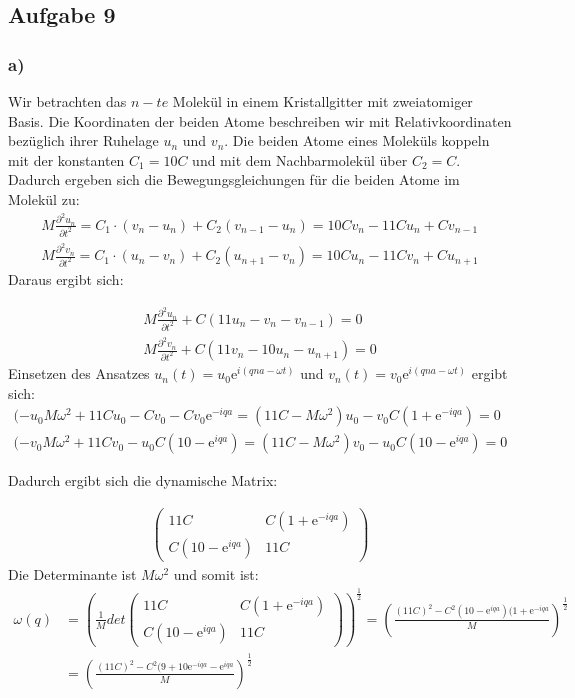 \documentclass[11pt]{article}
\begin{document}
\subsection*{Aufgabe 9}
\subsubsection*{a)}
Wir betrachten das $n-te$ Molekül in einem Kristallgitter mit zweiatomiger Basis. Die Koordinaten der beiden Atome beschreiben wir mit Relativkoordinaten bezüglich ihrer Ruhelage $u_n$ und $v_n$. Die beiden Atome eines Moleküls koppeln mit der konstanten $C_1 = 10C$ und mit dem Nachbarmolekül über $C_2 = C$. Dadurch ergeben sich die Bewegungsgleichungen für die beiden Atome im Molekül zu:
\begin{align*}
M\frac{\partial^2 u_n}{\partial t^2} = C_1\cdot (v_n-u_n)+C_2(v_{n-1}-u_n)=10Cv_n-11Cu_n+Cv_{n-1}\\
M\frac{\partial^2 v_n}{\partial t^2} = C_1\cdot (u_n-v_n)+C_2(u_{n+1}-v_n) = 10Cu_n-11Cv_n+Cu_{n+1}
\end{align*}
Daraus ergibt sich:

\begin{align*}
M\frac{\partial^2 u_n}{\partial t^2}+C(11u_n-v_n-v_{n-1})=0\\
M\frac{\partial^2 v_n}{\partial t^2}+C(11v_n-10u_n-u_{n+1})=0
\end{align*}
Einsetzen des Ansatzes $u_n(t)=u_0\mathrm{e}^{i(qna-\omega t)}$ und $v_n(t)=v_0\mathrm{e}^{i(qna-\omega t)}$ ergibt sich:
\begin{align*}
(-u_0M\omega^2+11Cu_0-Cv_0-Cv_0\mathrm{e}^{-iqa}=(11C-M\omega^2)u_0-v_0C(1+\mathrm{e}^{-iqa})=0\\
(-v_0M\omega^2+11Cv_0-u_0C(10-\mathrm{e}^{iqa})=(11C-M\omega^2)v_0-u_0C(10-\mathrm{e}^{iqa})=0
\end{align*}

Dadurch ergibt sich die dynamische Matrix:

\begin{align*}
\begin{pmatrix}
11C & C(1+\mathrm{e}^{-iqa})\\
C(10-\mathrm{e}^{iqa}) & 11C
\end{pmatrix}
\end{align*}
Die Determinante ist $M\omega^2$ und somit ist:
\begin{align*}
\omega(q)&=\left(\frac{1}{M}det\begin{pmatrix}
11C & C(1+\mathrm{e}^{-iqa})\\
C(10-\mathrm{e}^{iqa}) & 11C
\end{pmatrix}\right)^{\frac{1}{2}}
= \left(\frac{(11C)^2-C^2(10-\mathrm{e}^{iqa})(1+\mathrm{e}^{-iqa}}{M}\right)^{\frac{1}{2}}\\
&=\left(\frac{(11C)^2-C^2(9+10\mathrm{e}^{-iqa}-\mathrm{e}^{iqa}}{M}\right)^{\frac{1}{2}}
\end{align*}
\end{document}
